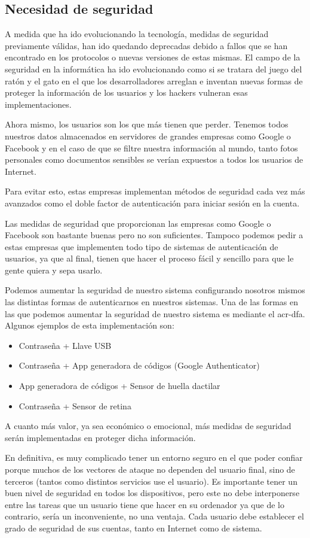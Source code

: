 \documentclass[twoside, titlepage, 12pt, a4paper]{article}
\begin{document}
\subsection{Necesidad de seguridad}
A medida que ha ido evolucionando la tecnología, medidas de seguridad previamente válidas, han ido quedando deprecadas debido a fallos que se han encontrado en los protocolos o nuevas versiones de estas mismas. El campo de la seguridad en la informática ha ido evolucionando como si se tratara del juego del ratón y el gato en el que los desarrolladores arreglan e inventan nuevas formas de proteger la información de los usuarios y los hackers vulneran esas implementaciones.\par Ahora mismo, los usuarios son los que más tienen que perder. Tenemos todos nuestros datos almacenados en servidores de grandes empresas como Google o Facebook y en el caso de que se filtre nuestra información al mundo, tanto fotos personales como documentos sensibles se verían expuestos a todos los usuarios de Internet.\par Para evitar esto, estas empresas implementan métodos de seguridad cada vez más avanzados como el doble factor de autenticación para iniciar sesión en la cuenta.\par Las medidas de seguridad que proporcionan las empresas como Google o Facebook son bastante buenas pero no son suficientes. Tampoco podemos pedir a estas empresas que implementen todo tipo de sistemas de autenticación de usuarios, ya que al final, tienen que hacer el proceso fácil y sencillo para que le gente quiera y sepa usarlo.\par Podemos aumentar la seguridad de nuestro sistema configurando nosotros mismos las distintas formas de autenticarnos en nuestros sistemas. Una de las formas en las que podemos aumentar la seguridad de nuestro sistema es mediante el \gls{acr-dfa}. Algunos ejemplos de esta implementación son:
\begin{itemize}
	\item Contraseña + Llave USB
	\item Contraseña + App generadora de códigos (Google Authenticator)
	\item App generadora de códigos + Sensor de huella dactilar
	\item Contraseña + Sensor de retina
\end{itemize}
A cuanto más valor, ya sea económico o emocional, más medidas de seguridad serán implementadas en proteger dicha información.\par
En definitiva, es muy complicado tener un entorno seguro en el que poder confiar porque muchos de los vectores de ataque no dependen del usuario final, sino de terceros (tantos como distintos servicios use el usuario). Es importante tener un buen nivel de seguridad en todos los dispositivos, pero este no debe interponerse entre las tareas que un usuario tiene que hacer en su ordenador ya que de lo contrario, sería un inconveniente, no una ventaja. Cada usuario debe establecer el grado de seguridad de sus cuentas, tanto en Internet como de sistema.\par
\end{document}
